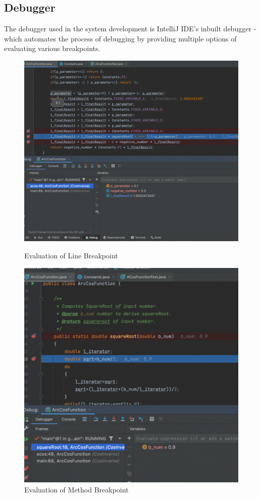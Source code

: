 \documentclass[a4paper,12pt]{article}
\begin{document}
\subsection{Debugger}
The debugger used in the system development is IntelliJ IDE's inbuilt debugger - which automates the process of debugging by providing multiple options of evaluating various breakpoints.
    \begin{figure}
     \centering
     \includegraphics[scale=0.45]{Line.png}
     \caption{Evaluation of Line Breakpoint}
     \centering
     \includegraphics[scale=0.5]{Method.png}
     \caption{Evaluation of Method Breakpoint}
    \end{figure}
\end{document}
